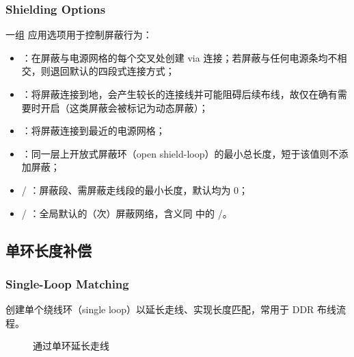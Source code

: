 \subsubsection*{Shielding Options}

一组  应用选项用于控制屏蔽行为：
\begin{itemize}
  \item {}：在屏蔽与电源网格的每个交叉处创建 via 连接；若屏蔽与任何电源条均不相交，则退回默认的四段式连接方式；
  \item {}：将屏蔽连接到地，会产生较长的连接线并可能阻碍后续布线，故仅在确有需要时开启（这类屏蔽会被标记为动态屏蔽）；
  \item {}：将屏蔽连接到最近的电源网格；
  \item {}：同一层上开放式屏蔽环（open shield-loop）的最小总长度，短于该值则不添加屏蔽；
  \item {} / ：屏蔽段、需屏蔽走线段的最小长度，默认均为 0；
  \item {} / ：全局默认的（次）屏蔽网络，含义同  中的 /。
\end{itemize}

\subsection{单环长度补偿}
\subsubsection*{Single-Loop Matching}

创建单个绕线环（single loop）以延长走线、实现长度匹配，常用于 DDR 布线流程。

\begin{figure}[htbp]
\centering
{}
\caption{通过单环延长走线}
\label{fig:single-loop-match}
\end{figure}


